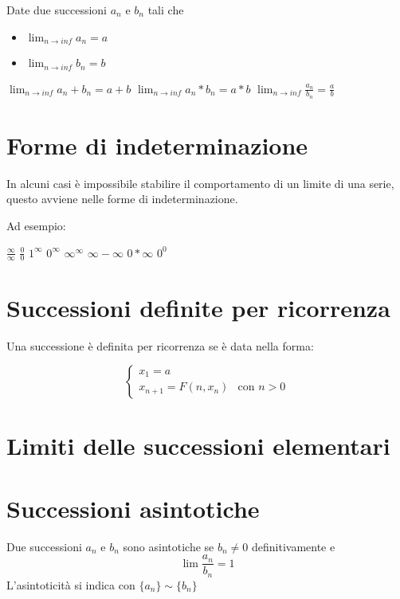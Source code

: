 Date due successioni $a_{n}$ e $b_{n}$ tali che 
\begin{itemize}
\item $\lim_{n \to inf} a_{n} = a$
\item $\lim_{n \to inf} b_{n} = b$
\end{itemize}

\begin{center}
$\lim_{n \to inf} a_{n} + b_{n} = a + b$ \qquad
$\lim_{n \to inf} a_{n} * b_{n} = a * b$ \qquad
$\lim_{n \to inf} \frac{a_{n}}{b_{n}} = \frac{a}{b}$
\end{center}

\section{Forme di indeterminazione}

In alcuni casi è impossibile stabilire il comportamento di un limite di una serie, questo avviene nelle forme di indeterminazione.

Ad esempio:

\begin{center}
$\frac{\infty}{\infty}$
\qquad $\frac{0}{0}$
\qquad $1^{\infty}$
\qquad $0^{\infty}$
\qquad $\infty^{\infty}$
\qquad $\infty - \infty$
\qquad $0 * \infty$
\qquad $0^{0}$
\end{center}

\section{Successioni definite per ricorrenza }

Una successione è definita per ricorrenza se è data nella forma:

$$ \begin{cases}
x_1 = a \\
x_{n+1} = F(n, x_n) & \mbox{con }n > 0
\end{cases} $$

\section{Limiti delle successioni elementari}

\section{Successioni asintotiche}

Due successioni ${a_{n}}$ e ${b_{n}}$ sono asintotiche se ${b_{n}} \neq 0$ definitivamente e $$\lim \frac{{a_{n}}}{{b_{n}}} = 1$$ L'asintoticità si indica con $\{a_{n}\} \sim \{b_{n}\}$

